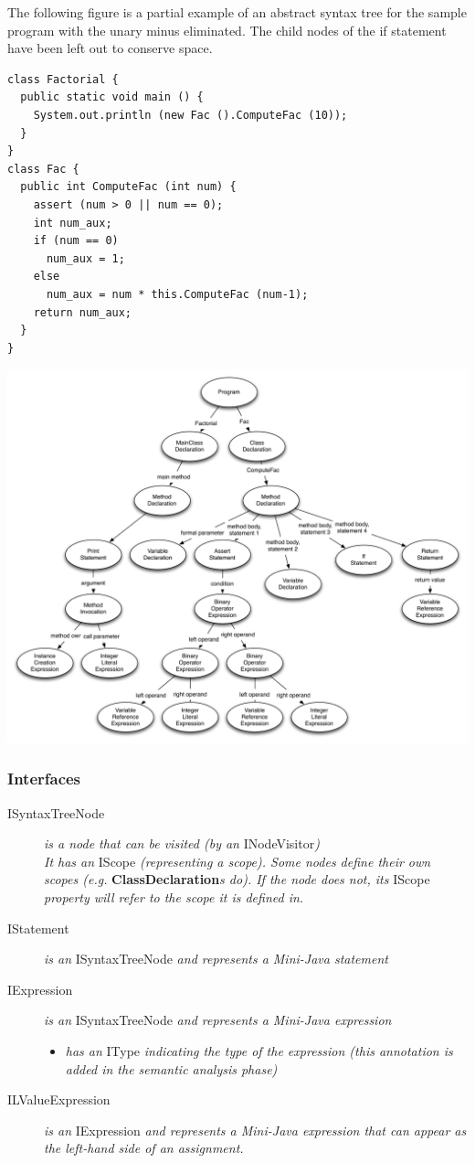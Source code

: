 \documentclass[a4paper,11pt]{article}
\begin{document}
The following figure is a partial example of an abstract syntax tree for the sample program with the unary minus eliminated. The child nodes of the if statement have been left out to conserve space.

\begin{verbatim}
class Factorial {
  public static void main () {
    System.out.println (new Fac ().ComputeFac (10));
  }
}
class Fac {
  public int ComputeFac (int num) {
    assert (num > 0 || num == 0);
    int num_aux;
    if (num == 0)
      num_aux = 1;
    else 
      num_aux = num * this.ComputeFac (num-1);
    return num_aux;
  }
}
\end{verbatim}

\includegraphics[width=1.0\textwidth]{syntaxtree.pdf}

\subsubsection{Interfaces}
\begin{description}
    \item[ISyntaxTreeNode] \emph{is a node that can be visited (by an} INodeVisitor\emph{)} \\
        \emph{It has an} IScope \emph{(representing a scope). Some nodes define their own scopes (e.g.} \textbf{ClassDeclaration}\emph{s do). If the node does not, its} IScope \emph{property will refer to the scope it is defined in.}
    \item[IStatement] \emph{is an} ISyntaxTreeNode \emph{and represents a Mini-Java statement}
    \item[IExpression] \emph{is an} ISyntaxTreeNode \emph{and represents a Mini-Java expression}
      \begin{itemize}
        \item \emph{has an} IType \emph{indicating the type of the expression (this annotation is added in the semantic analysis phase)}
      \end{itemize}
    \item[ILValueExpression] \emph{is an} IExpression \emph{and represents a Mini-Java expression that can appear as the left-hand side of an assignment.}
\end{description}
\end{document}
